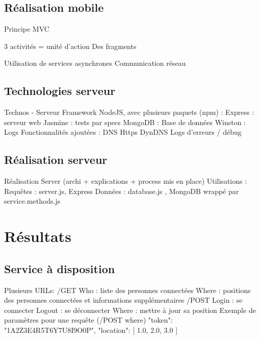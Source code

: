 \documentclass{beamer} %
\begin{document}
\subsection{Réalisation mobile}
\begin{frame}{\subsecname}
  Principe MVC

  3 activités
  = unité d’action
  Des fragments

  Utilisation de services asynchrones
  Communication réseau
\end{frame}

\subsection{Technologies serveur}
\begin{frame}{\subsecname}
  Technos - Serveur
  Framework NodeJS, avec plusieurs paquets (npm) :
  Express : serveur web
  Jasmine : tests par specs
  MongoDB : Base de données
  Winston : Logs
  Fonctionnalités ajoutées :
  DNS
  Https
  DynDNS
  Logs d’erreurs / débug
\end{frame}

\subsection{Réalisation serveur}
\begin{frame}{\subsecname}
  Réalisation Server (archi + explications + process mis en place)
  Utilisations :
  Requêtes : server.js, Express
  Données : database.js , MongoDB wrappé par service.methods.js
\end{frame}

\section{Résultats}
\subsection{Service à disposition}
\begin{frame}{\subsecname}
  Plusieurs URLs:
  /GET
  Who : liste des personnes connectées
  Where : positions des personnes connectées et informations supplémentaires
  /POST
  Login : se connecter
  Logout : se déconnecter
  Where : mettre à jour sa position
  Exemple de paramètres pour une requête (/POST where){
      "token": "1A2Z3E4R5T6Y7U8I9O0P",
      "location": [
          1.0,
          2.0,
          3.0
      ]
  }  
\end{frame}
\end{document}
